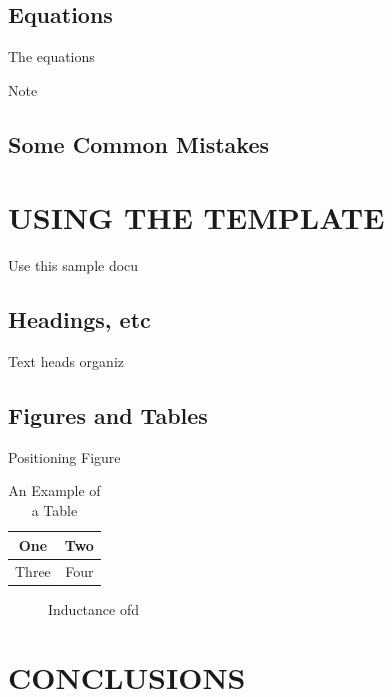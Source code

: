 \documentclass[letterpaper, 10 pt, conference]{ieeeconf}  %
\begin{document}
\subsection{Equations}

The equations



Note

\subsection{Some Common Mistakes}

\section{USING THE TEMPLATE}

Use this sample docu

\subsection{Headings, etc}

Text heads organiz

\subsection{Figures and Tables}

Positioning Figure



\begin{table}[h]
\caption{An Example of a Table}
\label{table_example}
\begin{center}
\begin{tabular}{|c||c|}
\hline
One & Two\\
\hline
Three & Four\\
\hline
\end{tabular}
\end{center}
\end{table}


   \begin{figure}[thpb]
      \centering
      \caption{Inductance ofd}
      \label{figurelabel}
   \end{figure}




\section{CONCLUSIONS}
\end{document}
